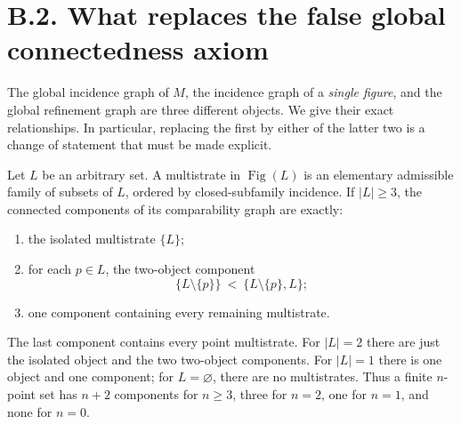\section{B.2. What replaces the false global connectedness axiom}
\label{SA21-B-connectedness}

The global incidence graph of \(M\), the incidence graph of a
\emph{single figure}, and the global refinement graph are three
different objects. We give their exact relationships. In
particular, replacing the first by either of the latter two is
a change of statement that must be made explicit.

\begin{theorem}
\label{SA21-B-incidence-components}
Let \(L\) be an arbitrary set. A multistrate in
\(\operatorname{Fig}(L)\) is an elementary admissible family of
subsets of \(L\), ordered by closed-subfamily incidence. If
\(|L|\geq3\), the connected components of its comparability
graph are exactly:
\begin{enumerate}
\item the isolated multistrate \(\{L\}\);
\item for each \(p\in L\), the two-object component
\[
 \{L\setminus\{p\}\}
 \ <\ \{L\setminus\{p\},L\};
\]
\item one component containing every remaining multistrate.
\end{enumerate}
The last component contains every point multistrate.
For \(|L|=2\) there are just the isolated object and the two
two-object components. For \(|L|=1\) there is one object and one
component; for \(L=\varnothing\), there are no multistrates.
Thus a finite \(n\)-point set has \(n+2\) components for
\(n\geq3\), three for \(n=2\), one for \(n=1\), and none for
\(n=0\).
\end{theorem}

